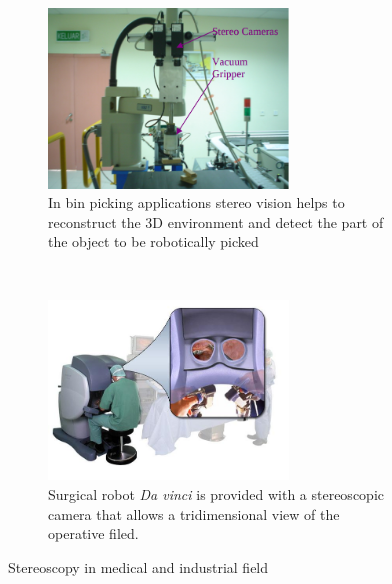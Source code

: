 \begin{figure}[h!]
\centering
\begin{subfigure}[]{0.5\textwidth}
		\centering
        \includegraphics[width=0.7\textwidth]{./img/bin_pick.png}
                \caption{\scriptsize{In bin picking applications \cite{BP} stereo vision helps to reconstruct the 3D environment and detect the part of the object to be robotically picked}}
\end{subfigure}%
~ \quad
\begin{subfigure}[]{0.5\textwidth}
	\centering
	\includegraphics[width=0.7\textwidth]{./img/da_vinci.jpg}
          \caption{\scriptsize{Surgical robot \textit{Da vinci} is provided with a stereoscopic camera that allows a tridimensional view of the operative filed.}}
\end{subfigure} 
\caption{\small{Stereoscopy in medical and industrial field}\label{appl0}}
\end{figure}

